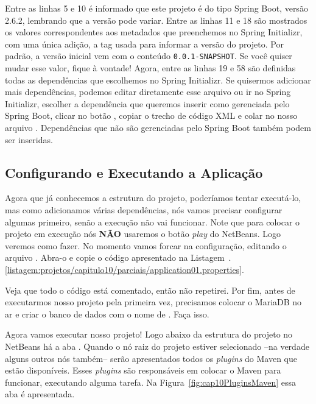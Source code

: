 Entre as linhas 5 e 10 é informado que este projeto é do tipo Spring Boot, versão 2.6.2, lembrando que a versão pode variar. Entre as linhas 11 e 18 são mostrados os valores correspondentes aos metadados que preenchemos no Spring Initializr, com uma única adição, a tag  usada para informar a versão do projeto. Por padrão, a versão inicial vem com o conteúdo \texttt{0.0.1-SNAPSHOT}. Se você quiser mudar esse valor, fique à vontade! Agora, entre as linhas 19 e 58 são definidas todas as dependências que escolhemos no Spring Initializr. Se quisermos adicionar mais dependências, podemos editar diretamente esse arquivo ou ir no Spring Initializr, escolher a dependência que queremos inserir como gerenciada pelo Spring Boot, clicar no botão , copiar o trecho de código XML e colar no nosso arquivo . Dependências que não são gerenciadas pelo Spring Boot também podem ser inseridas.


\subsection{Configurando e Executando a Aplicação}

Agora que já conhecemos a estrutura do projeto, poderíamos tentar executá-lo, mas como adicionamos várias dependências, nós vamos precisar configurar algumas primeiro, senão a execução não vai funcionar. Note que para colocar o projeto em execução nós \textbf{NÃO} usaremos o botão \textit{play} do NetBeans. Logo veremos como fazer. No momento vamos forcar na configuração, editando o arquivo . Abra-o e copie o código apresentado na Listagem~\thechapter.\ref{listagem:projetos/capitulo10/parciais/application01.properties}.


Veja que todo o código está comentado, então não repetirei. Por fim, antes de executarmos nosso projeto pela primeira vez, precisamos colocar o MariaDB no ar e criar o banco de dados com o nome de . Faça isso.

Agora vamos executar nosso projeto! Logo abaixo da estrutura do projeto no NetBeans há a aba . Quando o nó raiz do projeto estiver selecionado --na verdade alguns outros nós também-- serão apresentados todos os \textit{plugins} do Maven que estão disponíveis. Esses \textit{plugins} são responsáveis em colocar o Maven para funcionar, executando alguma tarefa. Na Figura~\ref{fig:cap10PluginsMaven} essa aba é apresentada.

